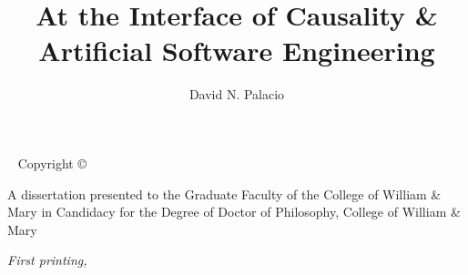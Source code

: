 \documentclass[nobib,xcolor=table]{tufte-book} %
\title{At the Interface of {\color{blue}Causality} \& \hfill \break Artificial Software Engineering } %
\author[]{David N. Palacio} %
\begin{document}
\frontmatter




\maketitle %


\newpage
\begin{fullwidth}
~\vfill
\thispagestyle{empty}
\setlength{\parindent}{0pt}
\setlength{\parskip}{\baselineskip}
Copyright \copyright\ \the\year\\ \thanklessauthor



\par A dissertation presented to the Graduate Faculty of the College of William \& Mary in Candidacy for the Degree of Doctor of Philosophy, College of William \& Mary 


\par\textit{First printing, \monthyear}
\end{fullwidth}
\end{document}
